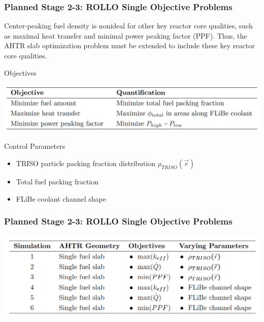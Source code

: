 \begin{frame}
    \frametitle{Planned Stage 2-3: ROLLO Single Objective Problems}
    Center-peaking fuel density is nonideal for other key reactor core 
        qualities, such as maximal heat transfer and minimal power peaking factor (PPF).
        Thus, the AHTR slab optimization problem must be extended to include 
        these key reactor core qualities. 
    \begin{block}{Objectives}
        \vspace{-0.2cm}
    \begin{table}
        \caption{ROLLO optimization problem objectives with their quantification 
        descriptions.}
        \includegraphics[width=0.7\linewidth]{figures/opt-obj.png}
    \end{table}
\end{block}
\vspace{-0.5cm}
\begin{block}{Control Parameters}
    \begin{itemize}
        \item TRISO particle packing fraction distribution $\rho_{TRISO}(\vec{r})$
        \item Total fuel packing fraction
        \item FLiBe coolant channel shape 
    \end{itemize}
\end{block}
\end{frame}

\begin{frame}
    \frametitle{Planned Stage 2-3: ROLLO Single Objective Problems}
    \begin{table}
        \caption{Proposed ROLLO simulations for AHTR fuel assembly single 
        objective optimization.
        PF: Total Fuel Packing Fraction, $\dot{Q}$: Heat transfer, $PPF$: Power Peaking Factor, 
        $\rho_{TRISO}(\vec{r})$: \gls{TRISO} particle distribution}
        \includegraphics[width=0.8\linewidth]{figures/single-obj.png}
    \end{table}
\end{frame}
